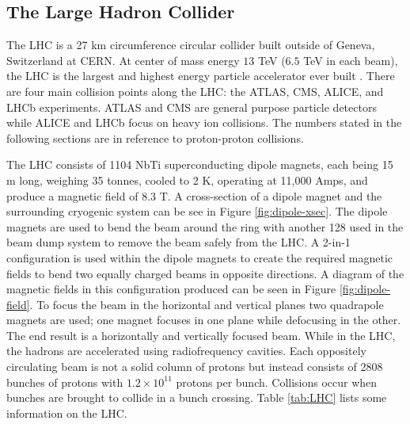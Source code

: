 
	\subsection{The Large Hadron Collider}\label{ssec:LHC}
		The \acrfull{LHC} is a 27 km circumference circular collider built outside of Geneva, Switzerland at \acrfull{CERN}. At center of mass energy $13$ TeV ($6.5$ TeV in each beam), the \gls{LHC} is the largest and highest energy particle accelerator ever built \cite{lhc-machine}. There are four main collision points along the \gls{LHC}: the \gls{ATLAS}, \gls{CMS}, ALICE, and LHCb experiments. \gls{ATLAS} and \gls{CMS} are general purpose particle detectors while ALICE and LHCb focus on heavy ion collisions. The numbers stated in the following sections are in reference to proton-proton collisions.

		The LHC consists of 1104 NbTi superconducting dipole magnets, each being 15 m long, weighing 35 tonnes, cooled to 2 K, operating at 11,000 Amps, and produce a magnetic field of 8.3 T. A cross-section of a dipole magnet and the surrounding cryogenic system can be see in Figure \ref{fig:dipole-xsec}. The dipole magnets are used to bend the beam around the ring with another 128 used in the beam dump system to remove the beam safely from the \gls{LHC}. A 2-in-1 configuration is used within the dipole magnets to create the required magnetic fields to bend two equally charged beams in opposite directions. A diagram of the magnetic fields in this configuration produced can be seen in Figure \ref{fig:dipole-field}. To focus the beam in the horizontal and vertical planes two quadrapole magnets are used; one magnet focuses in one plane while defocusing in the other. The end result is a horizontally and vertically focused beam. While in the \gls{LHC}, the hadrons are accelerated using radiofrequency cavities. Each oppositely circulating beam is not a solid column of protons but instead consists of 2808 bunches of protons with $1.2 \times 10^{11}$ protons per bunch. Collisions occur when bunches are brought to collide in a bunch crossing. Table \ref{tab:LHC} lists some information on the \gls{LHC}. 

